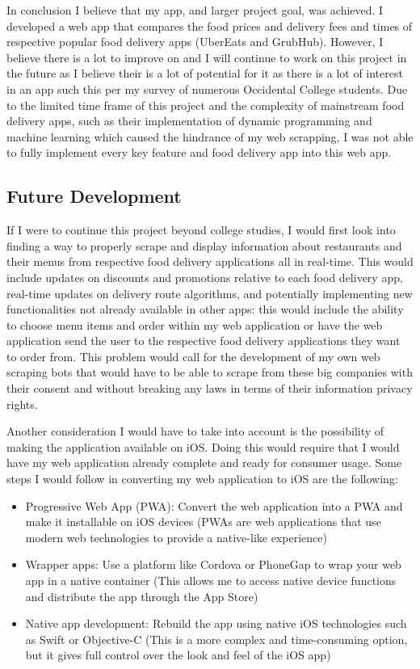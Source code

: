 \documentclass[10pt,twocolumn]{article}
\begin{document}
In conclusion I believe that my app, and larger project goal, was achieved. I developed a web app that compares the food prices and delivery fees and times of respective popular food delivery apps (UberEats and GrubHub). However, I believe there is a lot to improve on and I will continue to work on this project in the future as I believe their is a lot of potential for it as there is a lot of interest in an app such this per my survey of numerous Occidental College students. Due to the limited time frame of this project and the complexity of mainstream food delivery apps, such as their implementation of dynamic programming and machine learning which caused the hindrance of my web scrapping, I was not able to fully implement every key feature and food delivery app into this web app.

\subsection{Future Development}

If I were to continue this project beyond college studies, I would first look into finding a way to properly scrape and display information about restaurants and their menus from respective food delivery applications all in real-time. This would include updates on discounts and promotions relative to each food delivery app, real-time updates on delivery route algorithms, and potentially implementing new functionalities not already available in other apps: this would include the ability to choose menu items and order within my web application or have the web application send the user to the respective food delivery applications they want to order from. This problem would call for the development of my own web scraping bots that would have to be able to scrape from these big companies with their consent and without breaking any laws in terms of their information privacy rights. 

Another consideration I would have to take into account is the possibility of making the application available on iOS. Doing this would require that I would have my web application already complete and ready for consumer usage. Some steps I would follow in converting my web application to iOS are the following:

\begin{itemize} 
    \item Progressive Web App (PWA): Convert the web application into a PWA and make it installable on iOS devices (PWAs are web applications that use modern web technologies to provide a native-like experience)
    \item Wrapper apps: Use a platform like Cordova or PhoneGap to wrap your web app in a native container (This allows me to access native device functions and distribute the app through the App Store)
    \item Native app development: Rebuild the app using native iOS technologies such as Swift or Objective-C (This is a more complex and time-consuming option, but it gives full control over the look and feel of the iOS app)
\end{itemize}
\end{document}
